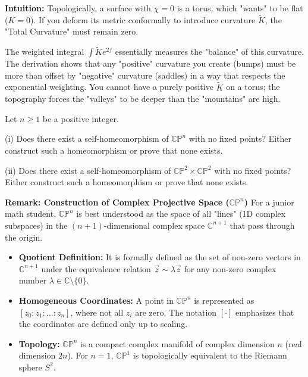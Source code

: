 \begin{solution}
\textbf{Intuition:}
Topologically, a surface with $\chi=0$ is a torus, which "wants" to be flat ($K=0$). If you deform its metric conformally to introduce curvature $\widetilde{K}$, the "Total Curvature" must remain zero. 

The weighted integral $\int \widetilde{K} e^{2f}$ essentially measures the "balance" of this curvature. The derivation shows that any "positive" curvature you create (bumps) must be more than offset by "negative" curvature (saddles) in a way that respects the exponential weighting. You cannot have a purely positive $\widetilde{K}$ on a torus; the topography forces the "valleys" to be deeper than the "mountains" are high.
\end{solution}

\begin{exercise}
\label{geometry:2025:6}
Let $n \geq 1$ be a positive integer.

(i) Does there exist a self-homeomorphism of $\mathbb{CP}^{n}$ with no fixed points? Either construct such a homeomorphism or prove that none exists.

(ii) Does there exist a self-homeomorphism of $\mathbb{CP}^{2} \times \mathbb{CP}^{2}$ with no fixed points? Either construct such a homeomorphism or prove that none exists.
\end{exercise}

\textbf{Remark: Construction of Complex Projective Space ($\mathbb{CP}^n$)}
For a junior math student, $\mathbb{CP}^n$ is best understood as the space of all "lines" (1D complex subspaces) in the $(n+1)$-dimensional complex space $\mathbb{C}^{n+1}$ that pass through the origin.
\begin{itemize}
    \item \textbf{Quotient Definition:} It is formally defined as the set of non-zero vectors in $\mathbb{C}^{n+1}$ under the equivalence relation $\vec{z} \sim \lambda \vec{z}$ for any non-zero complex number $\lambda \in \mathbb{C} \setminus \{0\}$. 
    \item \textbf{Homogeneous Coordinates:} A point in $\mathbb{CP}^n$ is represented as $[z_0 : z_1 : \dots : z_n]$, where not all $z_i$ are zero. The notation $[ \cdot ]$ emphasizes that the coordinates are defined only up to scaling.
    \item \textbf{Topology:} $\mathbb{CP}^n$ is a compact complex manifold of complex dimension $n$ (real dimension $2n$). For $n=1$, $\mathbb{CP}^1$ is topologically equivalent to the Riemann sphere $S^2$.
\end{itemize}

